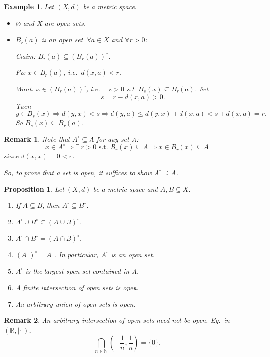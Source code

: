 \documentclass[12pt]{article}
\newtheorem*{remark}{Remark}
\newtheorem{proposition}{Proposition}
\newtheorem{example}{Example}
\begin{document}
\begin{example}
Let $(X,d)$ be a metric space.
\begin{itemize}
  \item $\varnothing$ and $X$ are open sets.
  \item $B_r(a)$ is an open set $\ \forall a\in X$ and $\forall r>0$:

  Claim: $B_r(a)\subseteq (B_r(a))^\circ$.

  Fix $x\in B_r(a)$, i.e.\ $d(x,a)<r$.

  Want: $x\in (B_r(a))^\circ$, i.e.\ $\exists\, s>0$ s.t.
  $B_s(x)\subseteq B_r(a)$. Set
  \[
  s=r-d(x,a)>0.
  \]
  Then
  \[
  y\in B_s(x)\Rightarrow d(y,x)<s
  \Rightarrow d(y,a)\le d(y,x)+d(x,a)<s+d(x,a)=r.
  \]
  So $B_s(x)\subseteq B_r(a)$.
\end{itemize}
\end{example}

\begin{remark}
Note that $A^\circ\subseteq A$ for any set $A$:
\[
x\in A^\circ \Rightarrow \exists\, r>0 \text{ s.t. } B_r(x)\subseteq A
\Rightarrow x\in B_r(x)\subseteq A
\]
since $d(x,x)=0<r$.

So, to prove that a set is open, it suffices to show $A^\circ\supseteq A$.
\end{remark}

\begin{proposition}
Let $(X,d)$ be a metric space and $A,B\subseteq X$.
\begin{enumerate}[label=\textbf{(\arabic*)}]
  \item If $A\subseteq B$, then $A^\circ\subseteq B^\circ$.
  \item $A^\circ\cup B^\circ\subseteq (A\cup B)^\circ$.
  \item $A^\circ\cap B^\circ=(A\cap B)^\circ$.
  \item $(A^\circ)^\circ=A^\circ$. In particular, $A^\circ$ is an open set.
  \item $A^\circ$ is the largest open set contained in $A$.
  \item A finite intersection of open sets is open.
  \item An arbitrary union of open sets is open.
\end{enumerate}
\end{proposition}

\begin{remark}
An arbitrary intersection of open sets need not be open. Eg.\ in
$(\mathbb{R},|\cdot|)$,
\[
\bigcap_{n\in\mathbb{N}}\left(-\frac{1}{n},\frac{1}{n}\right)=\{0\}.
\]
\end{remark}
\end{document}

